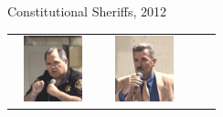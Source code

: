 \begin{frame}{Constitutional Sheriffs, 2012}
\begin{table}[h]
\centering
\begin{tabular}{cccc} 
    \includegraphics[width=0.75\textwidth,height=.24\textheight,keepaspectratio=true]{img/s1.png} &
    \includegraphics[width=0.75\textwidth,height=.24\textheight,keepaspectratio=true]{img/s2.png} &

\end{tabular}
\end{table}
\end{frame}
